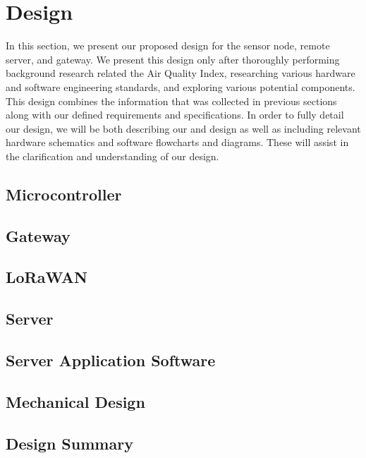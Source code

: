\section{Design}
In this section, we present our proposed design for the sensor node, remote server, and gateway. We present this design only after thoroughly performing background research related the Air Quality Index, researching various hardware and software engineering standards, and exploring various potential components. This design combines the information that was collected in previous sections along with our defined requirements and specifications. In order to fully detail our design, we will be both describing our and design as well as including relevant hardware schematics and software flowcharts and diagrams. These will assist in the clarification and understanding of our design.


\subsection{Microcontroller}
\subsection{Gateway}
\subsection{LoRaWAN}
\subsection{Server}
\subsection{Server Application Software}
\subsection{Mechanical Design}
\subsection{Design Summary}

